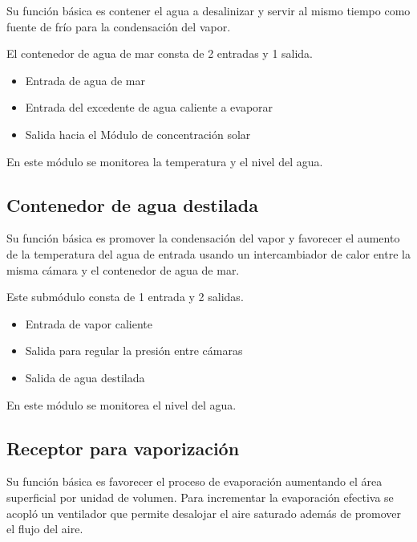 				Su función básica es contener el agua a desalinizar y servir al mismo tiempo como fuente de frío para la condensación del vapor.
				
				El contenedor de agua de mar consta de 2 entradas y 1 salida.
				\begin{itemize}[columns=2]
					\item Entrada de agua de mar
					\item Entrada del excedente de agua caliente a evaporar
					\item Salida hacia el Módulo de concentración solar
				\end{itemize}
				
				\begin{center}
					En este módulo se monitorea la temperatura y el nivel del agua.
				\end{center}			
			
			\subsection{Contenedor de agua destilada}
				
				Su función básica es promover la condensación del vapor y favorecer el aumento de la temperatura del agua de entrada usando un intercambiador de calor entre la misma cámara y el contenedor de agua de mar.
				
				Este submódulo consta de 1 entrada y 2 salidas.
				
				\begin{itemize}[columns=2]
					\item Entrada de vapor caliente \columnbreak
					\item Salida para regular la presión entre cámaras
					\item Salida de agua destilada
				\end{itemize}
				
				\begin{center}
					En este módulo se monitorea el nivel del agua.
				\end{center}
							
			\subsection{Receptor para vaporización}
				
				Su función básica es favorecer el proceso de evaporación aumentando el área superficial por unidad de volumen. Para incrementar la evaporación efectiva se acopló un ventilador que permite desalojar el aire saturado además de promover el flujo del aire.
				
